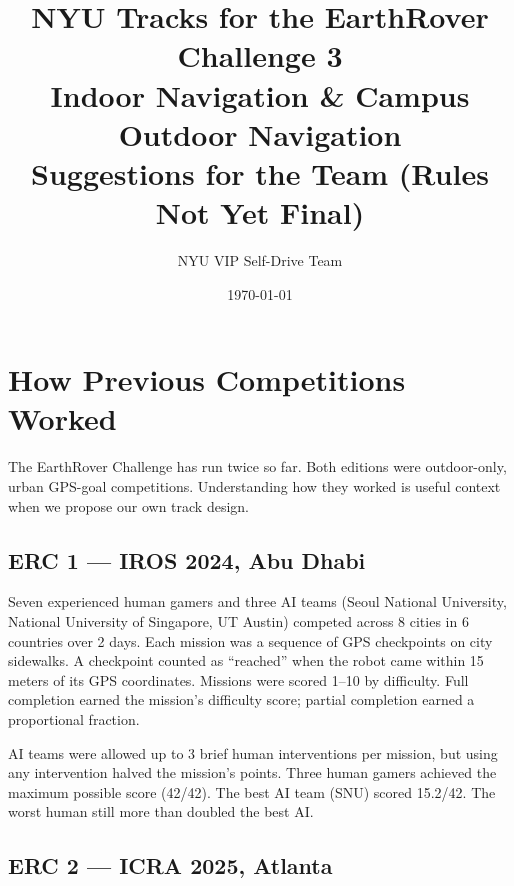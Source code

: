 \documentclass[11pt,a4paper]{article}
\title{NYU Tracks for the EarthRover Challenge 3\\[0.3em]
\large Indoor Navigation \& Campus Outdoor Navigation\\[0.5em]
\normalsize Suggestions for the Team (Rules Not Yet Final)}
\author{NYU VIP Self-Drive Team}
\date{\today}
\begin{document}
\maketitle

\begin{center}
\end{center}

\vspace{1em}
\tableofcontents
\newpage

\section{How Previous Competitions Worked}

The EarthRover Challenge has run twice so far. Both editions were outdoor-only, urban GPS-goal competitions. Understanding how they worked is useful context when we propose our own track design.

\subsection{ERC 1 --- IROS 2024, Abu Dhabi}

Seven experienced human gamers and three AI teams (Seoul National University, National University of Singapore, UT Austin) competed across 8 cities in 6 countries over 2 days. Each mission was a sequence of GPS checkpoints on city sidewalks. A checkpoint counted as ``reached'' when the robot came within 15 meters of its GPS coordinates. Missions were scored 1--10 by difficulty. Full completion earned the mission's difficulty score; partial completion earned a proportional fraction.

AI teams were allowed up to 3 brief human interventions per mission, but using any intervention halved the mission's points. Three human gamers achieved the maximum possible score (42/42). The best AI team (SNU) scored 15.2/42. The worst human still more than doubled the best AI.

\subsection{ERC 2 --- ICRA 2025, Atlanta}
\end{document}
